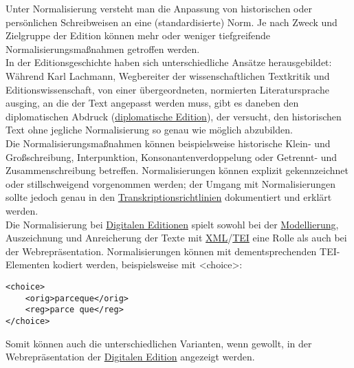 \documentclass{article}
\begin{document}
    Unter Normalisierung versteht man die Anpassung von historischen oder persönlichen
                  Schreibweisen an eine (standardisierte) Norm. Je nach Zweck und Zielgruppe der
                  Edition können mehr oder weniger tiefgreifende Normalisierungsmaßnahmen getroffen
                  werden. \\
            
        In der Editionsgeschichte haben sich unterschiedliche Ansätze herausgebildet:
                  Während Karl Lachmann, Wegbereiter der wissenschaftlichen Textkritik und
                  Editionswissenschaft, von einer übergeordneten, normierten Literatursprache
                  ausging, an die der Text angepasst werden muss, gibt es daneben den diplomatischen
                  Abdruck (\href{http://gams.uni-graz.at/o:konde.65}{diplomatische Edition}),
                  der versucht, den historischen Text ohne jegliche Normalisierung so genau wie
                  möglich abzubilden. \\
            
        Die Normalisierungsmaßnahmen können beispielsweise historische Klein- und
                  Großschreibung, Interpunktion, Konsonantenverdoppelung oder Getrennt- und
                  Zusammenschreibung betreffen. Normalisierungen können explizit gekennzeichnet oder
                  stillschweigend vorgenommen werden; der Umgang mit Normalisierungen sollte jedoch
                  genau in den \href{http://gams.uni-graz.at/o:konde.198}{Transkriptionsrichtlinien} dokumentiert und erklärt werden. \\
            
        Die Normalisierung bei \href{http://gams.uni-graz.at/o:konde.59}{Digitalen
                     Editionen} spielt sowohl bei der \href{http://gams.uni-graz.at/o:konde.137}{Modellierung}, Auszeichnung und Anreicherung der
                  Texte mit \href{http://gams.uni-graz.at/o:konde.215}{XML}/\href{http://gams.uni-graz.at/o:konde.178}{TEI} eine Rolle als auch bei der
                  Webrepräsentation. Normalisierungen können mit dementsprechenden TEI-Elementen
                  kodiert werden, beispielsweise mit <choice>:\\
            
        \begin{verbatim}<choice>
    <orig>parceque</orig>
    <reg>parce que</reg>
</choice>\end{verbatim}Somit können auch die unterschiedlichen Varianten, wenn gewollt, in der
                  Webrepräsentation der \href{http://gams.uni-graz.at/o:konde.59}{Digitalen
                     Edition} angezeigt werden.\\
            
\end{document}
